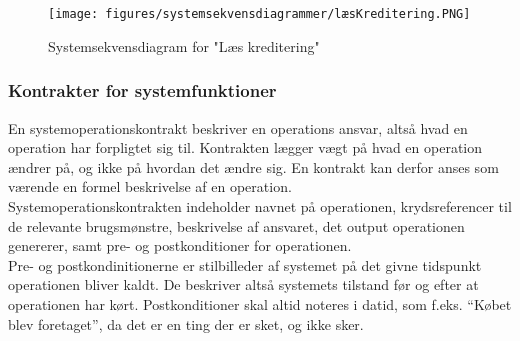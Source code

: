 \\

 \\

\begin{figure}[H]
\centering
\texttt{[image: figures/systemsekvensdiagrammer/læsKreditering.PNG]}
\caption{Systemsekvensdiagram for "Læs kreditering"}
\label{fig:read_credit}
\end{figure}


\subsubsection{Kontrakter for systemfunktioner}
En systemoperationskontrakt beskriver en operations ansvar, altså hvad en operation har forpligtet sig til. Kontrakten lægger vægt på hvad en operation ændrer på, og ikke på hvordan det ændre sig. En kontrakt kan derfor anses som værende en formel beskrivelse af en operation.\\
Systemoperationskontrakten indeholder navnet på operationen, krydsreferencer til de relevante brugsmønstre, beskrivelse af ansvaret, det output operationen genererer, samt pre- og postkonditioner for operationen. \\
Pre- og postkondinitionerne er stilbilleder af systemet på det givne tidspunkt operationen bliver kaldt. De beskriver altså systemets tilstand før og efter at operationen har kørt. Postkonditioner skal altid noteres i datid, som f.eks. “Købet blev foretaget”, da det er en ting der er sket, og ikke sker.\\

\noindent
{} \\


